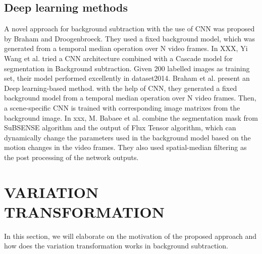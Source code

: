 \documentclass[runningheads,a4paper]{llncs}
\begin{document}
\subsection{Deep learning methods}
A novel approach for background subtraction with the use of CNN was proposed by Braham and Droogenbroeck. They used a fixed background model, which was generated from a temporal median operation over N video frames.
In XXX, Yi Wang et al. tried a CNN architecture combined with a Cascade model for segmentation in Background subtraction. Given 200 labelled images as training set, their model performed excellently in dataset2014.
Braham et al. present an Deep learning-based method. with the help of CNN, they generated a fixed background model from a temporal median operation over N video frames. Then, a scene-specific CNN is trained with corresponding image matrixes from the background image.
In xxx, M. Babaee et al. combine the segmentation mask from SuBSENSE algorithm and the output of Flux Tensor algorithm, which can dynamically change the parameters used in the background model based on the motion changes in the video frames. They also used spatial-median filtering as the post processing of the network outputs.

\section{VARIATION TRANSFORMATION}
In this section, we will elaborate on the motivation of the proposed approach and how does the variation transformation works in background subtraction.
\end{document}
